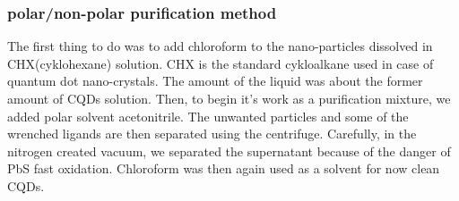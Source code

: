\subsubsection{polar/non-polar purification method} 


The first thing to do was to add chloroform to the nano-particles dissolved in CHX(cyklohexane) solution. CHX is the standard cykloalkane used in case of quantum dot nano-crystals. The amount of the liquid was about the former amount of CQDs solution. Then, to begin it's work as a purification mixture, we added polar solvent acetonitrile. The unwanted particles and some of the wrenched ligands are then separated using the centrifuge. Carefully, in the nitrogen created vacuum, we separated the supernatant because of the danger of PbS fast oxidation. Chloroform was then again used as a solvent for now clean CQDs.

